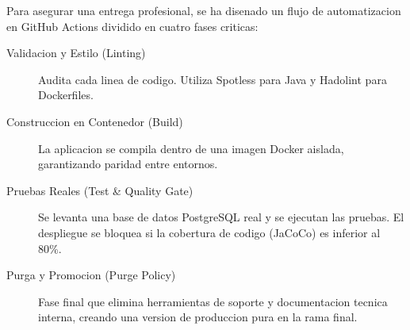 Para asegurar una entrega profesional, se ha disenado un flujo de automatizacion en GitHub Actions dividido en cuatro fases criticas:

\begin{description}
    \item[Validacion y Estilo (Linting)] Audita cada linea de codigo. Utiliza Spotless para Java y Hadolint para Dockerfiles.
    \item[Construccion en Contenedor (Build)] La aplicacion se compila dentro de una imagen Docker aislada, garantizando paridad entre entornos.
    \item[Pruebas Reales (Test \& Quality Gate)] Se levanta una base de datos PostgreSQL real y se ejecutan las pruebas. El despliegue se bloquea si la cobertura de codigo (JaCoCo) es inferior al 80\%.
    \item[Purga y Promocion (Purge Policy)] Fase final que elimina herramientas de soporte y documentacion tecnica interna, creando una version de produccion pura en la rama final.
\end{description}

